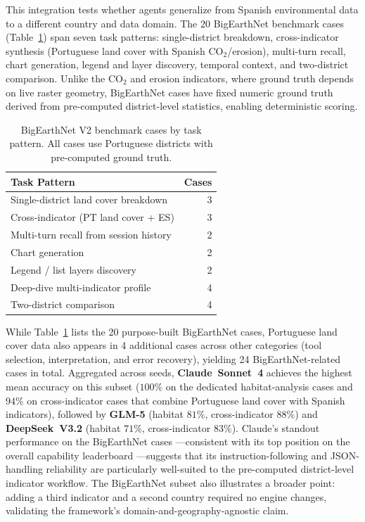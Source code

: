 \documentclass[sigconf]{acmart}
\begin{document}
This integration tests whether agents generalize from Spanish environmental data to a different country and data domain. The 20 BigEarthNet benchmark cases (Table~\ref{tab:bigearth_cases}) span seven task patterns: single-district breakdown, cross-indicator synthesis (Portuguese land cover with Spanish CO$_2$/erosion), multi-turn recall, chart generation, legend and layer discovery, temporal context, and two-district comparison. Unlike the CO$_2$ and erosion indicators, where ground truth depends on live raster geometry, BigEarthNet cases have fixed numeric ground truth derived from pre-computed district-level statistics, enabling deterministic scoring.

\begin{table}[ht]
    \caption{BigEarthNet V2 benchmark cases by task pattern. All cases use Portuguese districts with pre-computed ground truth.}
    \label{tab:bigearth_cases}
    \centering
    \begin{tabular}{lr}
        \toprule
        \textbf{Task Pattern} & \textbf{Cases} \\
        \midrule
        Single-district land cover breakdown     & 3 \\
        Cross-indicator (PT land cover + ES)     & 3 \\
        Multi-turn recall from session history   & 2 \\
        Chart generation                         & 2 \\
        Legend / list layers discovery           & 2 \\
        Deep-dive multi-indicator profile        & 4 \\
        Two-district comparison                  & 4 \\
        \bottomrule
    \end{tabular}
\end{table}

While Table~\ref{tab:bigearth_cases} lists the 20 purpose-built BigEarthNet cases, Portuguese land cover data also appears in 4 additional cases across other categories (tool selection, interpretation, and error recovery), yielding 24 BigEarthNet-related cases in total. Aggregated across seeds, \textbf{Claude~Sonnet~4} achieves the highest mean accuracy on this subset ($100\%$ on the dedicated habitat-analysis cases and $94\%$ on cross-indicator cases that combine Portuguese land cover with Spanish indicators), followed by \textbf{GLM-5} (habitat $81\%$, cross-indicator $88\%$) and \textbf{DeepSeek~V3.2} (habitat $71\%$, cross-indicator $83\%$). Claude's standout performance on the BigEarthNet cases ---consistent with its top position on the overall capability leaderboard ---suggests that its instruction-following and JSON-handling reliability are particularly well-suited to the pre-computed district-level indicator workflow. The BigEarthNet subset also illustrates a broader point: adding a third indicator and a second country required no engine changes, validating the framework's domain-and-geography-agnostic claim.
\end{document}
